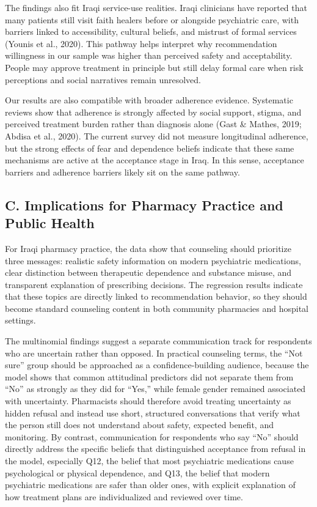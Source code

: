 \documentclass[12pt,a4paper]{article}
\begin{document}
The findings also fit Iraqi service-use realities. Iraqi clinicians have reported that many patients still visit faith healers before or alongside psychiatric care, with barriers linked to accessibility, cultural beliefs, and mistrust of formal services (Younis et al., 2020). This pathway helps interpret why recommendation willingness in our sample was higher than perceived safety and acceptability. People may approve treatment in principle but still delay formal care when risk perceptions and social narratives remain unresolved.

Our results are also compatible with broader adherence evidence. Systematic reviews show that adherence is strongly affected by social support, stigma, and perceived treatment burden rather than diagnosis alone (Gast \& Mathes, 2019; Abdisa et al., 2020). The current survey did not measure longitudinal adherence, but the strong effects of fear and dependence beliefs indicate that these same mechanisms are active at the acceptance stage in Iraq. In this sense, acceptance barriers and adherence barriers likely sit on the same pathway.

\subsection*{C. Implications for Pharmacy Practice and Public Health}
For Iraqi pharmacy practice, the data show that counseling should prioritize three messages: realistic safety information on modern psychiatric medications, clear distinction between therapeutic dependence and substance misuse, and transparent explanation of prescribing decisions. The regression results indicate that these topics are directly linked to recommendation behavior, so they should become standard counseling content in both community pharmacies and hospital settings.

The multinomial findings suggest a separate communication track for respondents who are uncertain rather than opposed. In practical counseling terms, the “Not sure” group should be approached as a confidence-building audience, because the model shows that common attitudinal predictors did not separate them from “No” as strongly as they did for “Yes,” while female gender remained associated with uncertainty. Pharmacists should therefore avoid treating uncertainty as hidden refusal and instead use short, structured conversations that verify what the person still does not understand about safety, expected benefit, and monitoring. By contrast, communication for respondents who say “No” should directly address the specific beliefs that distinguished acceptance from refusal in the model, especially Q12, the belief that most psychiatric medications cause psychological or physical dependence, and Q13, the belief that modern psychiatric medications are safer than older ones, with explicit explanation of how treatment plans are individualized and reviewed over time.
\end{document}
